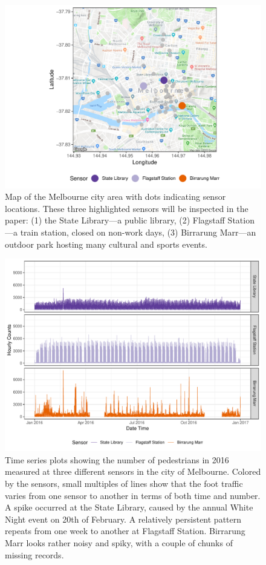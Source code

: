 \documentclass[12pt]{article}
\begin{document}
\begin{figure}

{\centering \includegraphics[width=0.7\linewidth]{figure/ped-map-1} 

}

\caption{Map of the Melbourne city area with dots indicating sensor locations. These three highlighted sensors will be inspected in the paper: (1) the State Library---a public library, (2) Flagstaff Station---a train station, closed on non-work days, (3) Birrarung Marr---an outdoor park hosting many cultural and sports events.}\label{fig:ped-map}
\end{figure}

\begin{figure}

{\centering \includegraphics[width=\textwidth]{figure/time-series-plot-1} 

}

\caption{Time series plots showing the number of pedestrians in 2016 measured at three different sensors in the city of Melbourne. Colored by the sensors, small multiples of lines show that the foot traffic varies from one sensor to another in terms of both time and number. A spike occurred at the State Library, caused by the annual White Night event on 20th of February. A relatively persistent pattern repeats from one week to another at Flagstaff Station. Birrarung Marr looks rather noisy and spiky, with a couple of chunks of missing records.}\label{fig:time-series-plot}
\end{figure}
\end{document}
